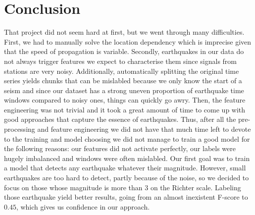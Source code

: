 \documentclass[10pt,conference,compsocconf]{IEEEtran}
\begin{document}
\section{Conclusion}
That project did not seem hard at first, but we went through many difficulties. First, we had to manually solve the location dependency which is imprecise given that the speed of propagation is variable. Secondly, earthquakes in our data do not always trigger features we expect to characterise them since signals from stations are very noisy. Additionally, automatically splitting the original time series yields chunks that can be mislabled because we only know the start of a seism and since our dataset has a strong uneven proportion of earthquake time windows compared to noisy ones, things can quickly go awry. Then, the feature engineering was not trivial and it took a great amount of time to come up with good approaches that capture the essence of earthquakes.\newline
Thus, after all the pre-processing and feature engineering we did not have that much time left to devote to the training and model choosing we did not manage to train a good model for the following reasons: our features did not activate perfectly, our labels were hugely imbalanced and windows were often mislabled. Our first goal was to train a model that detects any earthquake whatever their magnitude. However, small earthquakes are too hard to detect, partly because of the noise, so we decided to focus on those whose magnitude is more than $3$ on the Richter scale. Labeling those earthquake yield better results, going from an almost inexistent F-score to $0.45$, which gives us confidence in our approach.\newline
\end{document}
